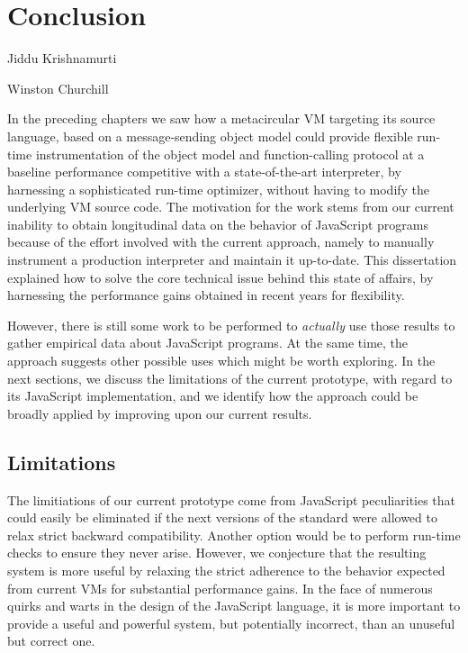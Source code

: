 \chapter{Conclusion}
\label{chap:Conclusion}

{Jiddu Krishnamurti}

{Winston Churchill}


In the preceding chapters we saw how a metacircular VM targeting its source
language, based on a message-sending object model could provide flexible
run-time instrumentation of the object model and function-calling protocol at a
baseline performance competitive with a state-of-the-art interpreter, by
harnessing a sophisticated run-time optimizer, without having to modify the
underlying VM source code. The motivation for the work stems from our current
inability to obtain longitudinal data on the behavior of JavaScript programs
because of the effort involved with the current approach, namely to manually
instrument a production interpreter and maintain it up-to-date. This
dissertation explained how to solve the core technical issue behind this state
of affairs, by harnessing the performance gains obtained in recent years for
flexibility.

However, there is still some work to be performed to \textit{actually} use
those results to gather empirical data about JavaScript programs. At the same
time, the approach suggests other possible uses which might be worth exploring.
In the next sections, we discuss the limitations of the current prototype, with
regard to its JavaScript implementation, and we identify how the approach could
be broadly applied by improving upon our current results.

\section{Limitations}

The limitiations of our current prototype come from JavaScript peculiarities
that could easily be eliminated if the next versions of the standard were
allowed to relax strict backward compatibility. Another option would be
to perform run-time checks to ensure they never arise.  However, we conjecture
that the resulting system is more useful by relaxing the strict adherence to
the behavior expected from current VMs for substantial performance gains.  In
the face of numerous quirks and warts in the design of the JavaScript language,
it is more important to provide a useful and powerful system, but potentially
incorrect, than an unuseful but correct one.


